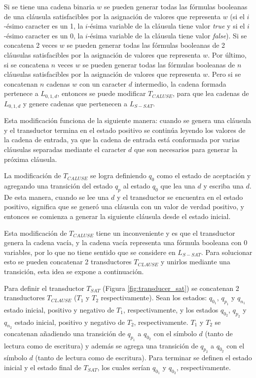 \documentclass[12pt]{article}
\newcommand{\true}{\textit{true}}
\newcommand{\false}{\textit{false}}
\begin{document}
Si se tiene una cadena binaria $w$ se pueden generar todas las fórmulas booleanas de una cláusula satisfacibles por la asignación de valores que representa 
$w$ (si el $i$-ésimo caracter es un 1, la $i$-ésima variable de la cláusula tiene valor \true{} y 
si el $i$-ésimo caracter es un 0, la $i$-ésima variable de la cláusula tiene valor \false{}). Si se concatena 2 veces $w$ se pueden 
generar todas las fórmulas booleanas de 2 cláusulas satisfacibles por la asignación de valores que representa
$w$. Por último, si se concatena $n$ veces $w$ se pueden 
generar todas las fórmulas booleanas de $n$ cláusulas satisfacibles por la asignación de valores que representa
$w$. Pero si se concatenan $n$ cadenas $w$ con un caracter $d$ intermedio, la cadena formada pertenece a $L_{0,1,d}$, 
entonces se puede modificar $T_{CALUSE}$, para que lea cadenas de $L_{0,1,d}$ y genere cadenas que pertenecen a $L_{S-SAT}$.

Esta modificación funciona de la siguiente manera: 
cuando se genera una cláusula y el transductor termina en el estado positivo se continúa leyendo los valores de la cadena de entrada, ya que la cadena de entrada está conformada por varias cláusulas separadas mediante el caracter $d$ que son necesarios para generar la próxima cláusula.

La modificación de $T_{CALUSE}$ se logra definiendo $q_0$ como el estado de aceptación y agregando una 
transición del estado $q_p$ al estado $q_0$ que lea una $d$ y escriba una $d$. De esta manera, cuando se lee una $d$ y el transductor se encuentra en el estado positivo, significa
que se generó una cláusula con un valor de verdad positivo, y entonces se comienza a generar la siguiente cláusula desde el estado inicial. 

Esta modificación de $T_{CALUSE}$ tiene un inconveniente y es que el transductor genera la cadena vacía, y la cadena vacía representa una fórmula booleana con 0 variables, por lo que no tiene sentido que se considere en $L_{S-SAT}$. Para solucionar esto se pueden concatenar 2 transductores $T_{CLAUSE}$ y unirlos mediante una transición, esta idea se expone a continuación.

Para definir el transductor $T_{SAT}$ (Figura \ref{fig:transducer_sat}) se concatenan 2 transductores $T_{CLAUSE}$ ($T_1$ y $T_2$ respectivamente). Sean los estados: $q_{0_1}$, $q_{p_1}$ y $q_{n_1}$ estado inicial, positivo y negativo de $T_1$, respectivamente, y los estados $q_{0_2}$, $q_{p_2}$ y $q_{n_2}$ estado inicial, positivo y negativo de $T_2$, respectivamente. $T_1$ y $T_2$ se concatenan añadiendo una transición de $q_{p_1}$ a $q_{0_2}$ con el símbolo $d$ (tanto de lectura como de escritura) y además se agrega una transición de $q_{p_2}$ a $q_{0_2}$ con el símbolo $d$ (tanto de lectura como de escritura).  Para terminar se definen el estado inicial y el estado final de $T_{SAT}$, los cuales serían $q_{0_1}$ y $q_{0_2}$, respectivamente.
\end{document}
